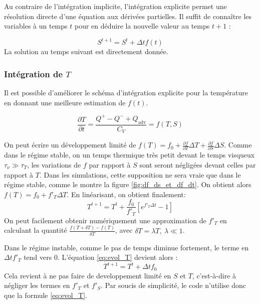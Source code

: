 Au contraire de l'intégration implicite, l'intégration explicite permet une
résolution directe d'une équation aux dérivées partielles. Il suffit de
connaître les variables à un temps $t$ pour en déduire la nouvelle valeur au
temps $t+1$ :

\begin{equation}
  S^{t+1} = S^t + \Delta t f(t)
\end{equation}
La solution au temps suivant est directement donnée.

\subsubsection{Intégration de $T$}
\label{ssec:integration_T}

Il est possible d'améliorer le schéma d'intégration explicite pour la
température en donnant une meilleure estimation de $f(t)$.

\begin{equation}
  \frac{\partial T}{\partial t} = \frac{Q^+ - Q^- + Q_\textrm{adv}}{C_V} = f(T, S)
\end{equation}

On peut écrire un développement limité de $f(T) = f_0 + \frac{\partial f}{\partial T}\Delta T + \frac{\partial f}{\partial S}\Delta S$. Comme dans le régime stable, on un temps thermique très petit devant le temps visqueux $\tau_\nu \gg \tau_T$, les variations de $f$ par rapport à $S$ sont seront négligées devant celles par rapport à $T$. Dans les simulations, cette supposition ne sera vraie que dans le régime stable, comme le montre la figure \ref{fig:df_ds_et_df_dt}. On obtient alors $f(T) = f_0 + f'_T \Delta T$. En linéarisant, on obtient finalement:
\begin{equation} 
  \label{eq:evol_T}
  T^{t+1} = T^t + \frac{f_0}{f'_T}\left[e^{f'_T\Delta t} - 1 \right]
\end{equation}
On
peut facilement obtenir numériquement une approximation de $f'_T$ en calculant
la quantité $\frac{f(T+\delta T) - f(T)}{\delta T}$, avec $\delta T = \lambda
T,\ \lambda \ll 1$.

Dans le régime instable, comme le pas de temps diminue fortement, le terme en $\Delta t f'_T$ tend vers 0. L'équation \eqref{eq:evol_T} devient alors :
\begin{equation}
  T^{t+1} = T^t + \Delta t f_0
\end{equation}
Cela revient à ne pas faire de developpement limité en $S$ et $T$, c'est-à-dire à négliger les termes en $f'_T$ et $f'_S$. Par soucis de simplicité, le code n'utilise donc que la formule \eqref{eq:evol_T}.

